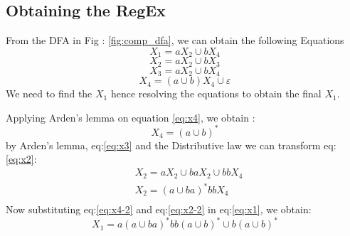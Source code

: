 \subsection*{Obtaining the RegEx}
From the DFA in Fig : \ref{fig:comp_dfa}, we can obtain the following Equations
\begin{equation}
\label{eq:x1}
        X_1 = aX_2 \cup bX_4
        \end{equation}
\begin{equation}
\label{eq:x2}
        X_2 = aX_2 \cup bX_3
        \end{equation}
\begin{equation}
\label{eq:x3}
        X_3 = aX_2 \cup bX_4
        \end{equation}
\begin{equation}
\label{eq:x4}
        X_4 = (a\cup b)X_4 \cup \varepsilon
        \end{equation}
We need to find the $X_1$ hence resolving the equations to obtain the final $X_1$.

Applying Arden's lemma on equation \ref{eq:x4}, we obtain : 
\begin{equation}
    \label{eq:x4-2}
    X_4 = {(a \cup b)} ^*
\end{equation}
by Arden's lemma, eq:\ref{eq:x3} and the Distributive law we can transform eq:\ref{eq:x2}:
\begin{equation}
    \label{eq:x2-2}
    \begin{split}
        &X_2 = aX_2 \cup baX_2 \cup bbX_4 \\
        &X_2 = {(a \cup ba)}^* bbX_4\\
    \end{split}
\end{equation}
Now substituting eq:\ref{eq:x4-2} and eq:\ref{eq:x2-2} in eq:\ref{eq:x1}, we obtain:
\begin{equation}
    X_1 = a{(a \cup ba)}^* bb{(a\cup b)}^* \cup b(a \cup b )^*
\end{equation}
